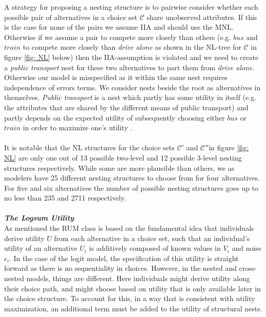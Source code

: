 A strategy for proposing a nesting structure is to pairwise consider whether each possible pair of alternatives in a choice set $\mathcal{C}$ share unobserved attributes. If this is the case for none of the pairs we assume IIA and should use the MNL. Otherwise if we assume a pair to compete more closely than others (e.g. $bus$ and $train$ to compete more closely than \textit{drive alone} as shown in the NL-tree for $\mathcal{C}$ in figure \ref{fig: NL} below) then the IIA-assumption is violated and we need to create a \textit{public transport} nest for these two alternatives to part them from \textit{drive alone}. Otherwise our model is misspecified as it within the same nest requires independence of errors terms.
We consider nests beside the root as alternatives in themselves. \textit{Public transport} is a nest which partly has some utility in itself (e.g. the attributes that are shared by the different means of public transport) and partly depends on the expected utility of subsequently choosing either $bus$ or $train$ in order to maximize one's utility \citep{koppelman_self_2006}.
\\ \\
It is notable that the NL structures for the choice sets $\mathcal{C'}$ and $\mathcal{C}''$in figure \ref{fig: NL} are only one out of 13 possible two-level and 12 possible 3-level nesting structures respectively. While some are more plausible than others, we as modelers have 25 different nesting structures to choose from for four alternatives. For five and six alternatives the number of possible nesting structures goes up to no less than 235 and 2711 respectively.
\\ \\
\textbf{\textit{The Logsum Utility}} \\
As mentioned the RUM class is based on the fundamental idea that individuals derive utility $U$ from each alternative in a choice set, such that an individual's utility of an alternative $U_i$ is additively composed of known values in $V_i$ and noise $\epsilon_i$. In the case of the logit model, the specification of this utility is straight forward as there is no sequentiality in choices. However, in the nested and cross-nested models, things are different. Here individuals might derive utility along their choice path, and might choose based on utility that is only available later in the choice structure. To account for this, in a way that is consistent with utility maximization, an additional term must be added to the utility of structural nests.

